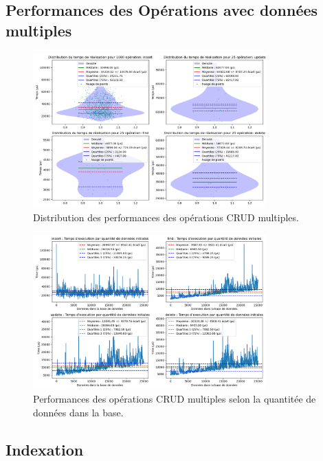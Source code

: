\documentclass[12pt,a4paper]{report}
\begin{document}
    \subsection{Performances des Opérations avec données multiples}

        \begin{figure}[H]
            \centering
            \includegraphics[width=0.8\textwidth]{../plots/MongoDB/sharding/global_test_many.png}
            \caption{Distribution des performances des opérations CRUD multiples.}
            \label{fig:mongo_sharded_global_many}
        \end{figure}

        \begin{figure}[H]
            \centering
            \includegraphics[width=0.8\textwidth]{../plots/MongoDB/sharding/test_many_various_data.png}
            \caption{Performances des opérations CRUD multiples selon la quantitée de données dans la base.}
            \label{fig:mongo_sharded_many_various}
        \end{figure}

        \subsection{Indexation}
        
\end{document}
